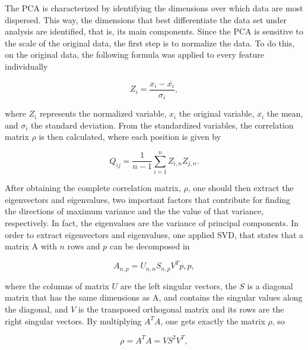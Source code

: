 The \ac{PCA} is characterized by identifying the dimensions over which data are most dispersed. This way, the dimensions that best differentiate the data set under analysis are identified, that is, its main components. Since the \ac{PCA} is sensitive to the scale of the original data, the first step is to normalize the data. To do this, on the original data, the following formula was applied to every feature individually

\begin{equation}
   Z_i = \frac{x_i-\overline{x_i}}{\sigma_i},
   \label{PCA1}
\end{equation}

where $Z_i$ represents the normalized variable, $x_i$ the original variable, $\overline{x_i}$ the mean, and $\sigma_i$ the standard deviation. From the standardized variables, the correlation matrix $\rho$ is then calculated, where each position is given by


\begin{equation}
   Q_{ij} = \frac{1}{n-1}\sum_{i=1}^nZ_{i,n}Z_{j,n}.
   \label{PCA2}
\end{equation}

After obtaining the complete correlation matrix, $\rho$, one should then extract the eigenvectors and eigenvalues, two important factors that contribute for finding the directions of maximum variance and the the value of that variance, respectively. In fact, the eigenvalues are the variance of principal components. In order to extract eigenvectors and eigenvalues, one applied \ac{SVD}, that states that a matrix A with $n$ rows and $p$ can be decomposed in 

\begin{equation}
   A_{n,p} = U_{n,n} S_{n,p} V^T{p,p},
   \label{PCA3}
\end{equation}

where the columns of matrix $U$ are the left singular vectors, the $S$ is a diagonal matrix that has the same dimensions as A, and contains the singular values along the diagonal, and $V$ is the transposed orthogonal matrix and its rows are the right singular vectors. By multiplying $A^TA$, one gets exactly the matrix $\rho$, so 

\begin{equation}
   \rho = A^TA = VS^2V^T,
   \label{PCA4}
\end{equation}

